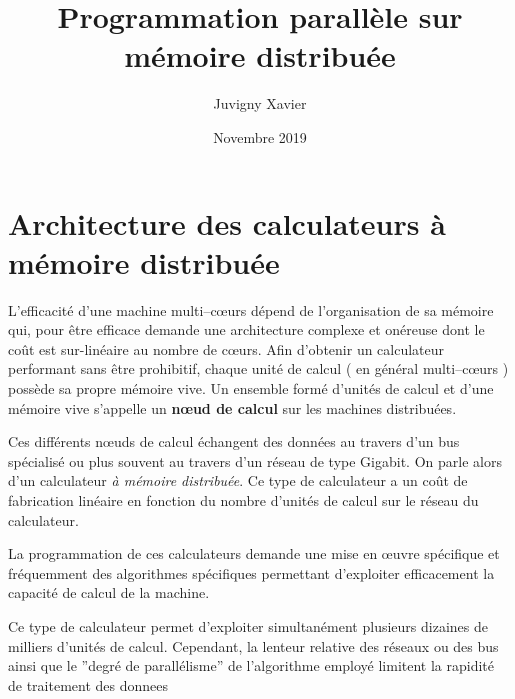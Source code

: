 \documentclass[fleqn,11pt]{article}
\title{Programmation parallèle sur mémoire distribuée}
\author{Juvigny Xavier}
\date{Novembre 2019}
\begin{document}
\maketitle
\tableofcontents

\section{Architecture des calculateurs à mémoire distribuée}

L'efficacité d'une machine multi--cœurs dépend de l'organisation de sa mémoire qui, pour être efficace demande une architecture complexe 
et onéreuse dont le coût est sur-linéaire au nombre de cœurs. Afin d'obtenir un calculateur performant sans être prohibitif, 
chaque unité de calcul ( en général multi--cœurs ) possède  sa propre mémoire vive. Un ensemble formé d'unités de calcul et 
d'une mémoire vive s'appelle un \textbf{nœud de calcul} sur les machines distribuées. 

Ces différents n{\oe}uds de calcul échangent des données au travers d'un bus spécialisé ou  plus souvent au travers d'un réseau de type 
Gigabit. On parle alors d'un calculateur \textsl{à mémoire distribuée}. Ce type de calculateur a un coût de fabrication linéaire en 
fonction du nombre d'unités de calcul sur le réseau du calculateur. 

La programmation de ces calculateurs demande une mise en œuvre spécifique et fréquemment des algorithmes spécifiques permettant d'exploiter efficacement la capacité de calcul de la machine.

Ce type de calculateur permet d'exploiter simultanément plusieurs dizaines de milliers d'unités de calcul. Cependant, la lenteur relative des réseaux ou des bus ainsi que le ''degré de parallélisme'' de l'algorithme employé limitent la rapidité de traitement des donnees
\end{document}
